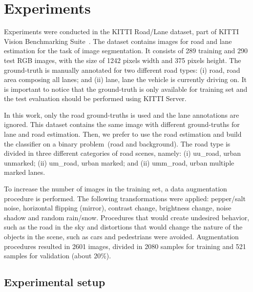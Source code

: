 \section{Experiments}
\label{sec:experiments}

Experiments were conducted in the KITTI Road/Lane dataset, part of KITTI Vision Benchmarking Suite~\cite{KITTI}. The dataset  contains  images for road and lane estimation for the task of image segmentation. It consists of 289 training and 290 test RGB images, with the size of 1242 pixels width and 375 pixels height. The ground-truth is manually annotated for two different road types: (i) road, road area composing all lanes; and (ii) lane, lane the vehicle is currently driving on. It is important to notice that the ground-truth is only available for training set and the test evaluation should be performed using KITTI Server.


In this work, only the road ground-truths is used and the lane annotations are ignored. This dataset contains the same image with different ground-truths for lane and road estimation. Then, we prefer to use the road estimation and build the classifier on a binary problem~(road and background). The road type is divided in three different categories of road scenes, namely: (i) uu\_road, urban unmarked; (ii) um\_road, urban marked; and (ii) umm\_road, urban multiple marked lanes.  


To increase the number of images in the training set, a data augmentation procedure is performed. The following transformations were applied: pepper/salt noise, horizontal flipping (mirror), contrast change, brightness change, noise shadow and random rain/snow. Procedures that would create undesired behavior, such as the road in the sky and distortions that would change the nature of the objects in the scene, such as cars and pedestrians were avoided. Augmentation procedures resulted in 2601 images, divided in 2080 samples for training and 521 samples for validation (about 20\%). 


\subsection{Experimental setup}
   
